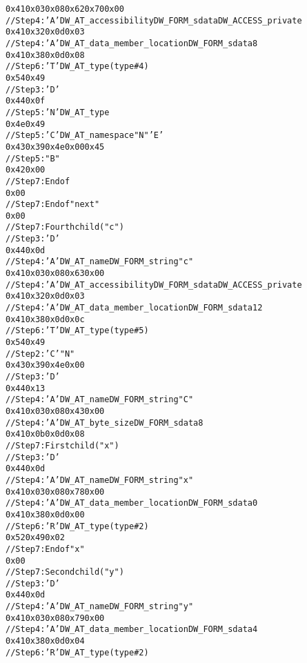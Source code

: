 \begin{alltt}
    0x41 0x03 0x08 0x62 0x70 0x00
    // Step 4: 'A' DW\-\_AT\-\_accessibility DW\-\_FORM\-\_sdata DW\-\_ACCESS\-\_private
    0x41 0x32 0x0d 0x03
    // Step 4: 'A' DW\-\_AT\-\_data\-\_member\-\_location DW\-\_FORM\-\_sdata 8
    0x41 0x38 0x0d 0x08
    // Step 6: 'T' DW\-\_AT\-\_type (type \#4)
    0x54 0x49
        // Step 3: 'D' 
0x44 0x0f
        // Step 5: 'N' DW\-\_AT\-\_type
        0x4e 0x49
        // Step 5: 'C' DW\-\_AT\-\_namespace "N" 'E'
        0x43 0x39 0x4e 0x00 0x45
        // Step 5: "B"
        0x42 0x00
        // Step 7: End of 
        0x00
    // Step 7: End of  "next"
    0x00
// Step 7: Fourth child ("c")
    // Step 3: 'D' 
    0x44 0x0d
    // Step 4: 'A' DW\-\_AT\-\_name DW\-\_FORM\-\_string "c"
    0x41 0x03 0x08 0x63 0x00
    // Step 4: 'A' DW\-\_AT\-\_accessibility DW\-\_FORM\-\_sdata DW\-\_ACCESS\-\_private
    0x41 0x32 0x0d 0x03
    // Step 4: 'A' DW\-\_AT\-\_data\-\_member\-\_location DW\-\_FORM\-\_sdata 12
    0x41 0x38 0x0d 0x0c
    // Step 6: 'T' DW\-\_AT\-\_type (type \#5)
    0x54 0x49
        // Step 2: 'C'  "N"
        0x43 0x39 0x4e 0x00
        // Step 3: 'D' 
        0x44 0x13
        // Step 4: 'A' DW\-\_AT\-\_name DW\-\_FORM\-\_string "C"
        0x41 0x03 0x08 0x43 0x00
        // Step 4: 'A' DW\-\_AT\-\_byte\-\_size DW\-\_FORM\-\_sdata 8
        0x41 0x0b 0x0d 0x08
        // Step 7: First child ("x")
            // Step 3: 'D' 
            0x44 0x0d
            // Step 4: 'A' DW\-\_AT\-\_name DW\-\_FORM\-\_string "x"
            0x41 0x03 0x08 0x78 0x00
            // Step 4: 'A' DW\-\_AT\-\_data\-\_member\-\_location DW\-\_FORM\-\_sdata 0
            0x41 0x38 0x0d 0x00
            // Step 6: 'R' DW\-\_AT\-\_type (type \#2)
            0x52 0x49 0x02
            // Step 7: End of  "x"
            0x00
        // Step 7: Second child ("y")
            // Step 3: 'D' 
            0x44 0x0d
            // Step 4: 'A' DW\-\_AT\-\_name DW\-\_FORM\-\_string "y"
            0x41 0x03 0x08 0x79 0x00
            // Step 4: 'A' DW\-\_AT\-\_data\-\_member\-\_location DW\-\_FORM\-\_sdata 4
            0x41 0x38 0x0d 0x04
            // Step 6: 'R' DW\-\_AT\-\_type (type \#2)

\end{alltt}
